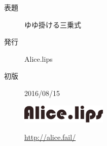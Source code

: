 \documentclass[b5paper,12pt]{jbook}
\begin{document}
\thispagestyle{empty}
\vspace*{110mm}
\begin{flushright}
    \begin{minipage}{70mm}
        \begin{screen}
            \begin{description}
                \item[表題] ゆゆ掛ける三乗式
                \item[発行] Alice.lips
                \item[初版] 2016/08/15
                \item[] \hspace*{3mm} \includegraphics[width=41mm, bb=0 0 476 103]{resources/logo.png} \vspace*{-4mm}
                \item[] \hspace*{18mm} \url{http://alice.fail/}
            \end{description}
        \end{screen}
    \end{minipage}
\end{flushright}
\end{document}
